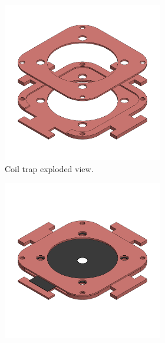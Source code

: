 \begin{figure}[H]
    \centering
    \begin{subfigure}[b]{0.8\linewidth}
        \begin{subfigure}[b]{0.475\textwidth}
            \centering
            \includegraphics[width=\linewidth]{Chapters/Chapter5/Flexible_Mat_Prototypes/Figures/coil_trap_expl.png}
            \caption{Coil trap exploded view.}
            \label{fig: coil_trap_expl}
        \end{subfigure}
        \hfill
        \begin{subfigure}[b]{0.475\textwidth}
            \centering
            \includegraphics[width=\linewidth]{Chapters/Chapter5/Flexible_Mat_Prototypes/Figures/coil_trap_closed.png}

\end{subfigure}
\end{subfigure}
\end{figure}
